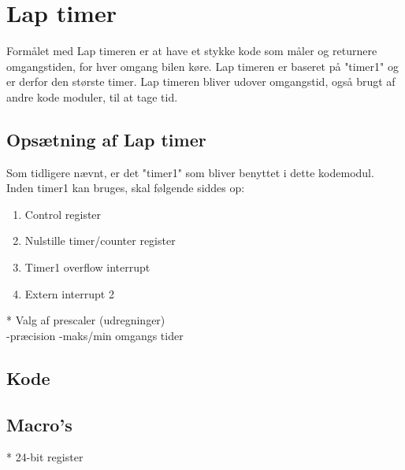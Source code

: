 \newpage
\section{Lap timer}
Formålet med Lap timeren er at have et stykke kode som måler og returnere omgangstiden, for hver omgang bilen køre. Lap timeren er baseret på "timer1" og er derfor den største timer. Lap timeren bliver udover omgangstid, også brugt af andre kode moduler, til at tage tid.
\subsection{Opsætning af Lap timer}
Som tidligere nævnt, er det "timer1" som bliver benyttet i dette kodemodul. Inden timer1 kan bruges, skal følgende siddes op:
\begin{enumerate}
\item Control register
\item Nulstille timer/counter register
\item Timer1 overflow interrupt
\item Extern interrupt 2 
\end{enumerate}



* Valg af prescaler (udregninger)\\
	-præcision
	-maks/min omgangs tider 


\subsection{Kode}
\subsection{Macro's}


	
* 24-bit register\\